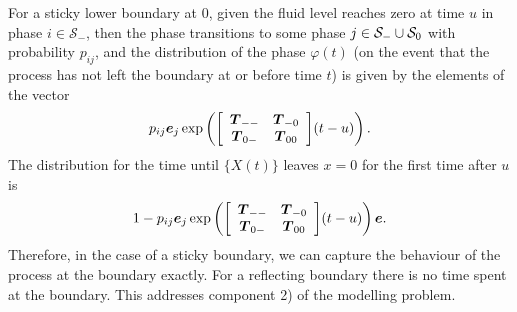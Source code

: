 
For a sticky lower boundary at \(0\), given the fluid level reaches zero at time \(u\) in phase \(i\in\mathcal S_-\), then the phase transitions to some phase \(j\in\mathcal{S}_-\cup\mathcal{S}_0\) with probability \(p_{ij}\), and the distribution of the phase \(\varphi(t)\) (on the event that the process has not left the boundary at or before time \(t\)) is given by the elements of the vector
\[p_{ij} \boldsymbol e_j \exp\left({\left[\begin{array}{cc} \boldsymbol T_{--} & \boldsymbol T_{-0} \\ \boldsymbol T_{0-} & \boldsymbol T_{00}\end{array}\right]}(t-u)\right).\] 
The distribution for the time until \(\{X(t)\}\) leaves \(x=0\) for the first time after \(u\) is 
\[1-p_{ij}\boldsymbol e_j \exp\left({\left[\begin{array}{cc} \boldsymbol T_{--} & \boldsymbol T_{-0} \\ \boldsymbol T_{0-} & \boldsymbol T_{00}\end{array}\right]}(t-u)\right)\boldsymbol e.\] 
Therefore, in the case of a sticky boundary, we can capture the behaviour of the process at the boundary exactly. For a reflecting boundary there is no time spent at the boundary. This addresses component 2) of the modelling problem. 

